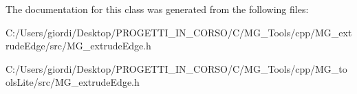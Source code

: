 The documentation for this class was generated from the following files\-:\begin{DoxyCompactItemize}
\item 
C\-:/\-Users/giordi/\-Desktop/\-P\-R\-O\-G\-E\-T\-T\-I\-\_\-\-I\-N\-\_\-\-C\-O\-R\-S\-O/\-C/\-M\-G\-\_\-\-Tools/cpp/\-M\-G\-\_\-extrude\-Edge/src/M\-G\-\_\-extrude\-Edge.\-h\item 
C\-:/\-Users/giordi/\-Desktop/\-P\-R\-O\-G\-E\-T\-T\-I\-\_\-\-I\-N\-\_\-\-C\-O\-R\-S\-O/\-C/\-M\-G\-\_\-\-Tools/cpp/\-M\-G\-\_\-tools\-Lite/src/M\-G\-\_\-extrude\-Edge.\-h\end{DoxyCompactItemize}
